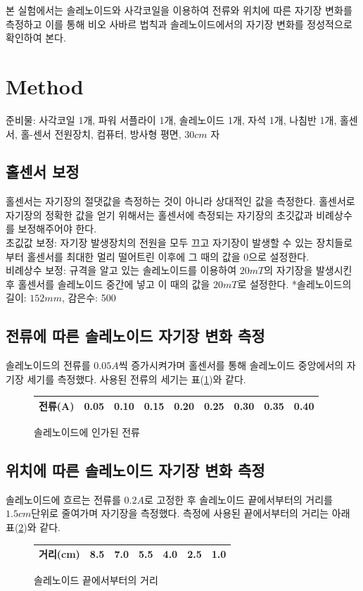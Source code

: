 \documentclass[a4paper]{article}
\begin{document}
	본 실험에서는 솔레노이드와 사각코일을 이용하여 전류와 위치에 따른 자기장 변화를 측정하고 이를 통해 비오 사바르 법칙과 솔레노이드에서의 자기장 변화를 정성적으로 확인하여 본다.

\section{Method}
	준비물: 사각코일 1개, 파워 서플라이 1개, 솔레노이드 1개, 자석 1개, 나침반 1개, 홀센서, 홀-센서 전원장치, 컴퓨터, 방사형 평면, $30\si{cm}$ 자
	\subsection{홀센서 보정}
		홀센서는 자기장의 절댓값을 측정하는 것이 아니라 상대적인 값을 측정한다.
		홀센서로 자기장의 정확한 값을 얻기 위해서는 홀센서에 측정되는 자기장의 초깃값과 비례상수를 보정해주어야 한다. \\
		초깂값 보정: 자기장 발생장치의 전원을 모두 끄고 자기장이 발생할 수 있는 장치들로부터 홀센서를 최대한 멀리 떨어트린 이후에 그 때의 값을 0으로 설정한다. \\
		비례상수 보정: 규격을 알고 있는 솔레노이드를 이용하여 $20\si{mT}$의 자기장을 발생시킨 후 홀센서를 솔레노이드 중간에 넣고 이 때의 값을 $20\si{mT}$로 설정한다.
		*솔레노이드의 길이: $152\si{mm}$, 감은수: 500

	\subsection{전류에 따른 솔레노이드 자기장 변화 측정}
		솔레노이드의 전류를 $0.05\si{A}$씩 증가시켜가며 홀센서를 통해 솔레노이드 중앙에서의 자기장 세기를 측정했다.
		사용된 전류의 세기는 표(\ref{tab:soli})와 같다.
		\begin{figure}[h]
			\centering
			\begin{tabular}{c|cccccccc}
				\hline \hline
				전류(A) & 0.05 & 0.10 & 0.15 & 0.20 & 0.25 & 0.30 & 0.35 & 0.40 \\
				\hline \hline 
			\end{tabular}
			\caption{솔레노이드에 인가된 전류}
			\label{tab:soli}
		\end{figure} 

	\subsection{위치에 따른 솔레노이드 자기장 변화 측정}
		솔레노이드에 흐르는 전류를 $0.2\si{A}$로 고정한 후 솔레노이드 끝에서부터의 거리를 $1.5\si{cm}$단위로 줄여가며 자기장을 측정했다.
		측정에 사용된 끝에서부터의 거리는 아래 표(\ref{tab:sold})와 같다.
		\begin{figure}[h]
			\centering
			\begin{tabular}{c|cccccc}
				\hline \hline
				거리(\si{cm}) & 8.5 & 7.0 & 5.5 & 4.0 & 2.5 & 1.0 \\
				\hline \hline
			\end{tabular}
			\caption{솔레노이드 끝에서부터의 거리}
			\label{tab:sold}
		\end{figure}
\end{document}

